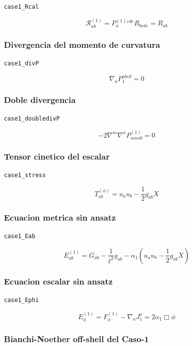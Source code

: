 \documentclass[11pt,a4paper]{article}
\begin{document}
\noindent\texttt{case1\_Rcal}\par\nopagebreak[4]

\[
\mathcal R^{(1)}_{ab}=P^{(1)}_a{}^{cde}R_{bcde} = R_{ab}
\]

\subsubsection{Divergencia del momento de curvatura}

\noindent\texttt{case1\_divP}\par\nopagebreak[4]

\[
\nabla_aP_1^{abcd} = 0
\]

\subsubsection{Doble divergencia}

\noindent\texttt{case1\_doubledivP}\par\nopagebreak[4]

\[
-2\nabla^m\nabla^nP^{(1)}_{amnb} = 0
\]

\subsubsection{Tensor cinetico del escalar}

\noindent\texttt{case1\_stress}\par\nopagebreak[4]

\[
T^{(\phi)}_{ab} = u_au_b-\frac12g_{ab}X
\]

\subsubsection{Ecuacion metrica sin ansatz}

\noindent\texttt{case1\_Eab}\par\nopagebreak[4]

\[
E^{(1)}_{ab} = G_{ab}-\frac{1}{\ell^2}g_{ab}-\alpha_1\left(u_au_b-\frac12g_{ab}X\right)
\]

\subsubsection{Ecuacion escalar sin ansatz}

\noindent\texttt{case1\_Ephi}\par\nopagebreak[4]

\[
E^{(1)}_\phi=F_\phi^{(1)}-\nabla_aJ_1^a = 2\alpha_1\Box\phi
\]

\subsubsection{Bianchi-Noether off-shell del Caso-1}
\end{document}
